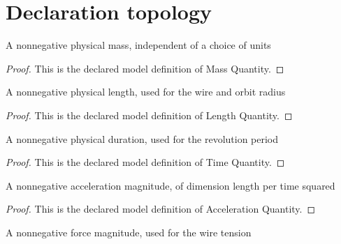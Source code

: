 \section{Declaration topology}
\begin{definition}
  \label{def:physics:phyx-mini-0807:phyxminiproblems-problemphyxmini0807-massquantity}
  A nonnegative physical mass, independent of a choice of units
\end{definition}
\begin{proof}
  This is the declared model definition of Mass Quantity.
\end{proof}
\begin{definition}
  \label{def:physics:phyx-mini-0807:phyxminiproblems-problemphyxmini0807-lengthquantity}
  A nonnegative physical length, used for the wire and orbit radius
\end{definition}
\begin{proof}
  This is the declared model definition of Length Quantity.
\end{proof}
\begin{definition}
  \label{def:physics:phyx-mini-0807:phyxminiproblems-problemphyxmini0807-timequantity}
  A nonnegative physical duration, used for the revolution period
\end{definition}
\begin{proof}
  This is the declared model definition of Time Quantity.
\end{proof}
\begin{definition}
  \label{def:physics:phyx-mini-0807:phyxminiproblems-problemphyxmini0807-accelerationquantity}
  A nonnegative acceleration magnitude, of dimension length per time squared
\end{definition}
\begin{proof}
  This is the declared model definition of Acceleration Quantity.
\end{proof}
\begin{definition}
  \label{def:physics:phyx-mini-0807:phyxminiproblems-problemphyxmini0807-forcequantity}
  A nonnegative force magnitude, used for the wire tension
\end{definition}
